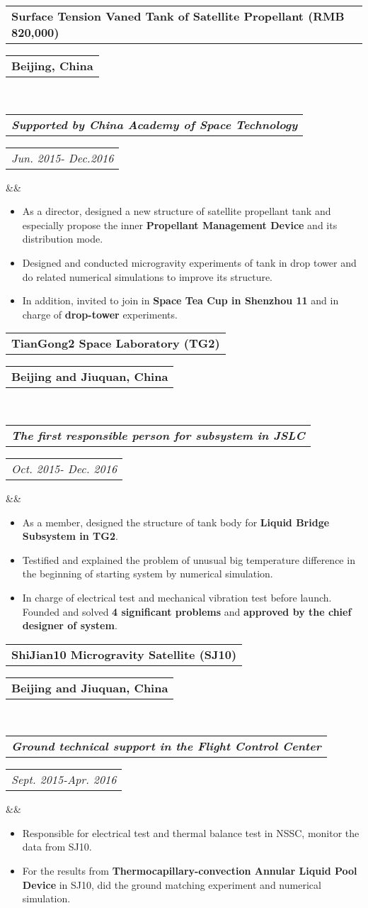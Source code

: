 \documentclass[11pt,a4paper,palatine]{moderncv}        %
\makeatletter
\newcommand*{\customcventry}[7][.25em]{
  \begin{tabular}{@{}l} 
    {\bfseries #4}
  \end{tabular}
  \hfill%
  \begin{tabular}{l@{}}
     {\bfseries #5}
  \end{tabular} \\
  \begin{tabular}{@{}l} 
    {\itshape #3}
  \end{tabular}
  \hfill%
  \begin{tabular}{l@{}}
     {\itshape #2}
  \end{tabular}
  \ifx&#7&%
  \else{\\%
    \begin{minipage}{\maincolumnwidth}%
      \small#7%
    \end{minipage}}\fi%
  \par\addvspace{#1}}
\makeatother
\begin{document}
\begin{CJK*}{UTF8}{gbsn}
{\customcventry{  Jun. 2015- Dec.2016}{\textbf{Supported by China Academy of Space Technology}}{Surface Tension Vaned Tank of Satellite Propellant (RMB 820,000)}{Beijing, China}{}{}}
  {\begin{itemize}
    \item As a director, designed a new structure of satellite propellant tank and especially propose the inner \textbf{Propellant Management Device} and its distribution mode.  
    \item Designed and conducted microgravity experiments of tank in drop tower and do related numerical simulations to improve its structure.
    \item In addition, invited to join in \textbf{Space Tea Cup in Shenzhou 11} and in charge of \textbf{drop-tower} experiments.
  \end{itemize}
}

\setlength{\parskip}{0.5em}

{\customcventry{Oct. 2015- Dec. 2016}{\textbf{The first responsible person for subsystem in JSLC}}{TianGong2 Space Laboratory (TG2)}{Beijing and Jiuquan, China}{}{}}
  {\begin{itemize}
    \item  As a member, designed the structure of tank body for \textbf{Liquid Bridge Subsystem in TG2}.
    \item  Testified and explained the problem of unusual big temperature difference in the beginning of starting system by numerical simulation. 
    \item  In charge of electrical test and mechanical vibration test before launch. Founded and solved \textbf{4 significant problems} and \textbf{approved by the chief designer of system}. 
  \end{itemize}
}

\setlength{\parskip}{0.5em}

{\customcventry{Sept. 2015-Apr. 2016}{\textbf{Ground technical support in the Flight Control Center}}{ShiJian10 Microgravity Satellite (SJ10)}{Beijing and Jiuquan, China}{}{}}
  {\begin{itemize}
    \item  Responsible for electrical test and thermal balance test in NSSC, monitor the data from SJ10.
    \item  For the results from \textbf{Thermocapillary-convection Annular Liquid Pool Device} in SJ10, did the ground matching experiment and numerical simulation.
  \end{itemize}
}



\end{CJK*}
\end{document}
